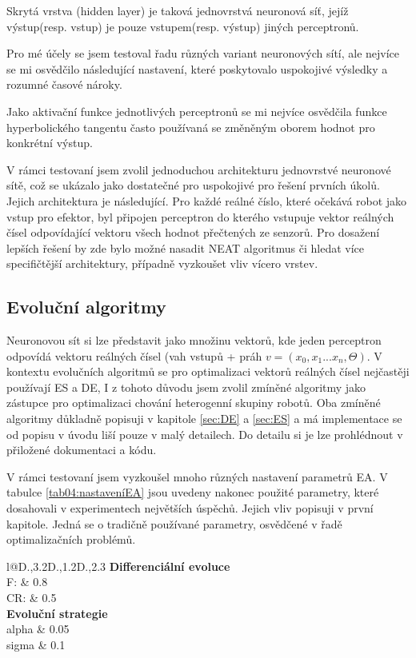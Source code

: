 \par
Skrytá vrstva (hidden layer) je taková jednovrstvá neuronová síť, jejíž výstup(resp. vstup) je pouze vstupem(resp. výstup) jiných perceptronů.
\par
Pro mé účely se jsem testoval řadu různých variant neuronových sítí, ale nejvíce se mi osvědčilo následující nastavení, které poskytovalo uspokojivé výsledky a rozumné časové nároky. 
\par 
Jako aktivační funkce jednotlivých perceptronů se mi nejvíce osvědčila funkce hyperbolického tangentu často používaná se změněným oborem hodnot pro konkrétní výstup.
\par
V rámci testovaní jsem zvolil jednoduchou architekturu jednovrstvé neuronové sítě, což se ukázalo jako dostatečné pro uspokojivé pro řešení prvních úkolů. Jejich architektura je následující. Pro každé reálné číslo, které očekává robot jako vstup pro efektor, byl připojen perceptron do kterého vstupuje vektor reálných čísel odpovídající vektoru všech hodnot přečtených ze senzorů.  Pro dosažení lepších řešení by zde bylo možné nasadit NEAT algoritmus či hledat více specifičtější architektury, případně vyzkoušet vliv vícero vrstev. 
\subsection*{Evoluční algoritmy}
Neuronovou sít si lze představit jako množinu vektorů, kde jeden perceptron odpovídá vektoru reálných čísel (vah vstupů + práh $v =(x_0,x_1...x_n,\Theta)$. V kontextu evolučních algoritmů se pro optimalizaci vektorů reálných čísel nejčastěji používají ES a DE, I z tohoto důvodu jsem zvolil zmíněné algoritmy jako zástupce pro optimalizaci chování heterogenní skupiny robotů. Oba zmíněné algoritmy důkladně popisuji v kapitole \ref{sec:DE} a \ref{sec:ES} a má implementace se od popisu v úvodu liší pouze v malý detailech. Do detailu si je lze prohlédnout v přiložené dokumentaci a kódu. 
\par
V rámci testovaní jsem vyzkoušel mnoho různých nastavení parametrů EA. V tabulce \ref{tab04:nastaveníEA} jsou uvedeny nakonec použité parametry, které dosahovali v experimentech největších úspěchů. Jejich vliv popisuji v první kapitole. Jedná se o tradičně používané parametry, osvědčené v řadě optimalizačních problémů. 
\begin{table}[h]\centering
	\begin{tabular}{l@{\hspace{1.5cm}}D{.}{,}{3.2}D{.}{,}{1.2}D{.}{,}{2.3}}
		\toprule
		 \textbf{Differenciální evoluce}\\
		\midrule
		F:     & 0.8 \\
		CR:  & 0.5 \\
		\toprule
		\textbf{Evoluční strategie}\\
		\midrule
		alpha & 0.05 \\
		sigma & 0.1\\
		\bottomrule
	\end{tabular}
	\caption{Nastavení parametrů u EA}
	\label{tab04:nastaveníEA}
\end{table}
\newpage
